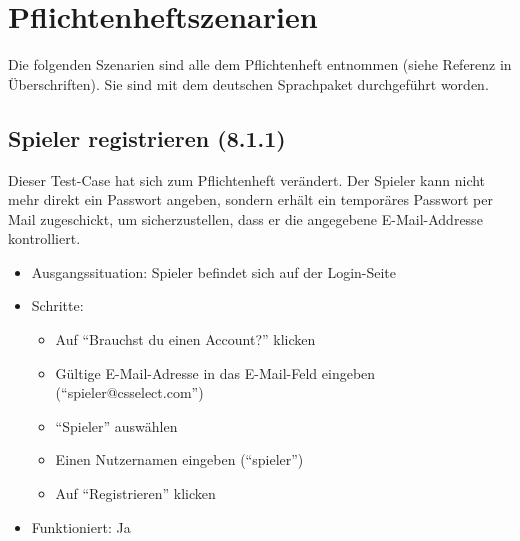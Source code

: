 \documentclass[a4paper]{scrreprt}
\begin{document}
        \section{Pflichtenheftszenarien}
        Die folgenden Szenarien sind alle dem Pflichtenheft entnommen (siehe Referenz in Überschriften). Sie sind mit dem deutschen Sprachpaket durchgeführt worden.

            \subsection{Spieler registrieren (8.1.1)}
            Dieser Test-Case hat sich zum Pflichtenheft verändert.
            Der Spieler kann nicht mehr direkt ein Passwort angeben, sondern erhält ein temporäres Passwort per Mail zugeschickt,
            um sicherzustellen, dass er die angegebene E-Mail-Addresse kontrolliert.
            \begin{itemize}
                \item Ausgangssituation: Spieler befindet sich auf der Login-Seite
                \item Schritte:
                    \begin{itemize}
                        \item Auf \enquote{Brauchst du einen Account?} klicken
                        \item Gültige E-Mail-Adresse in das E-Mail-Feld eingeben (\enquote{spieler@csselect.com})
                        \item \enquote{Spieler} auswählen
                        \item Einen Nutzernamen eingeben (\enquote{spieler})
                        \item Auf \enquote{Registrieren} klicken
                    \end{itemize}
                \item Funktioniert: Ja
            \end{itemize}
\end{document}
